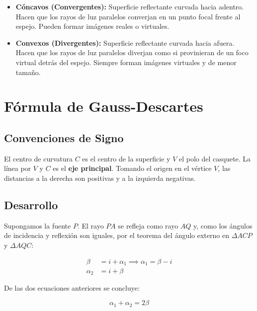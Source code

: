 \documentclass[12pt, a4paper]{article}
\theoremstyle{definition}
\begin{document}
\begin{itemize}
  \item \textbf{Cóncavos (Convergentes):} Superficie reflectante curvada hacia adentro. Hacen que los rayos de luz paralelos converjan en un punto focal frente al espejo. Pueden formar imágenes reales o virtuales.
  \item \textbf{Convexos (Divergentes):} Superficie reflectante curvada hacia afuera. Hacen que los rayos de luz paralelos diverjan como si provinieran de un foco virtual detrás del espejo. Siempre forman imágenes virtuales y de menor tamaño.
\end{itemize}

\section{Fórmula de Gauss-Descartes}

\subsection{Convenciones de Signo}

El centro de curvatura \(C\) es el centro de la superficie y \(V\) el polo del casquete. La línea por \(V\) y \(C\) es el \textbf{eje principal}. Tomando el origen en el vértice \(V\), las distancias a la derecha son positivas y a la izquierda negativas.

\subsection{Desarrollo}

Supongamos la fuente \(P\). El rayo \(PA\) se refleja como rayo \(AQ\) y, como los ángulos de incidencia y reflexión son iguales, por el teorema del ángulo externo en \(\Delta ACP\) y \(\Delta AQC\):

\begin{align}
  \beta &= i + \alpha_1 \implies \alpha_1 = \beta - i \label{eq:gauss1} \\
  \alpha_2 &= i + \beta \label{eq:gauss2}
\end{align}

De las dos ecuaciones anteriores se concluye:

\begin{equation}
  \alpha_1 + \alpha_2 = 2\beta
  \label{eq:gauss3}
\end{equation}
\end{document}
